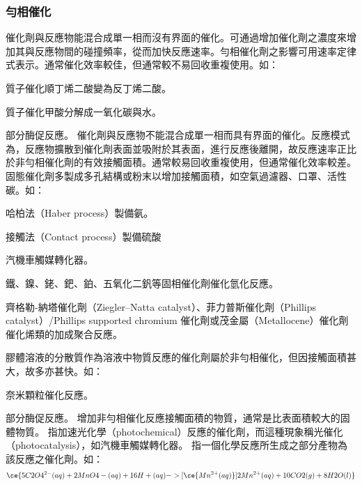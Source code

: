 \documentclass[a4paper,12pt]{article}
\begin{document}
\subsubsection{勻相催化}
催化劑與反應物能混合成單一相而沒有界面的催化。可通過增加催化劑之濃度來增加其與反應物間的碰撞頻率，從而加快反應速率。勻相催化劑之影響可用速率定律式表示。通常催化效率較佳，但通常較不易回收重複使用。如：
\bit
\item {}
\item {}
\item {}
\item 質子催化順丁烯二酸變為反丁烯二酸。
\item 質子催化甲酸分解成一氧化碳與水。
\item 部分酶促反應。
\eit
{}
催化劑與反應物不能混合成單一相而具有界面的催化。反應模式為，反應物擴散到催化劑表面並吸附於其表面，進行反應後離開，故反應速率正比於非勻相催化劑的有效接觸面積。通常較易回收重複使用，但通常催化效率較差。固態催化劑多製成多孔結構或粉末以增加接觸面積，如空氣過濾器、口罩、活性碳。如：
\bit
\item {}
\item {}
\item 哈柏法（Haber process）製備氨。
\item 接觸法（Contact process）製備硫酸
\item 汽機車觸媒轉化器。
\item 鐵、鎳、銠、鈀、鉑、五氧化二釩等固相催化劑催化氫化反應。
\item 齊格勒-納塔催化劑（Ziegler–Natta catalyst）、菲力普斯催化劑（Phillips catalyst）/Phillips supported chromium 催化劑或茂金屬（Metallocene）催化劑催化烯類的加成聚合反應。
\eit

膠體溶液的分散質作為溶液中物質反應的催化劑屬於非勻相催化，但因接觸面積甚大，故多亦甚快。如：
\bit
\item 奈米顆粒催化反應。
\item 部分酶促反應。
\eit
{}
增加非勻相催化反應接觸面積的物質，通常是比表面積較大的固體物質。
指加速光化學（photochemical）反應的催化劑，而這種現象稱光催化（photocatalysis），如汽機車觸媒轉化器。
指一個化學反應所生成之部分產物為該反應之催化劑。如：
\[\ce{5C2O4^{2-}(aq) + 2MnO4-(aq) + 16H+(aq) ->[\ce{Mn^{2+}(aq)}] 2Mn^{2+}(aq) + 10CO2(g) + 8H2O(l)}\]
\end{document}
